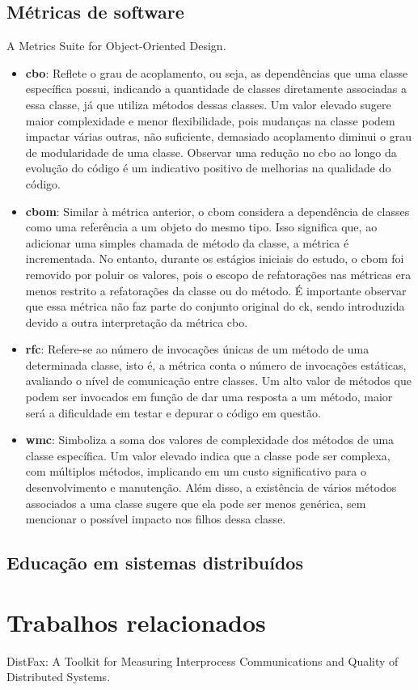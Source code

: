 \subsection{Métricas de software}
A Metrics Suite for Object-Oriented Design.
\cite{MetricsSuite}

\begin{itemize}
    \item \textbf{\gls{cbo}}: Reflete o grau de acoplamento, ou seja, as dependências que uma classe específica possui, indicando a quantidade de classes diretamente associadas a essa classe, já que utiliza métodos dessas classes. Um valor elevado sugere maior complexidade e menor flexibilidade, pois mudanças na classe podem impactar várias outras, não suficiente, demasiado acoplamento diminui o grau de modularidade de uma classe. Observar uma redução no \gls{cbo} ao longo da evolução do código é um indicativo positivo de melhorias na qualidade do código.
    \item \textbf{\gls{cbom}}: Similar à métrica anterior, o \gls{cbom} considera a dependência de classes como uma referência a um objeto do mesmo tipo. Isso significa que, ao adicionar uma simples chamada de método da classe, a métrica é incrementada. No entanto, durante os estágios iniciais do estudo, o \gls{cbom} foi removido por poluir os valores, pois o escopo de refatorações nas métricas era menos restrito a refatorações da classe ou do método. É importante observar que essa métrica não faz parte do conjunto original do \gls{ck}, sendo introduzida devido a outra interpretação da métrica \gls{cbo}.
    \item \textbf{\gls{rfc}}: Refere-se ao número de invocações únicas de um método de uma determinada classe, isto é, a métrica conta o número de invocações estáticas, avaliando o nível de comunicação entre classes. Um alto valor de métodos que podem ser invocados em função de dar uma resposta a um método, maior será a dificuldade em testar e depurar o código em questão.
    \item \textbf{\gls{wmc}}: Simboliza a soma dos valores de complexidade dos métodos de uma classe específica. Um valor elevado indica que a classe pode ser complexa, com múltiplos métodos, implicando em um custo significativo para o desenvolvimento e manutenção. Além disso, a existência de vários métodos associados a uma classe sugere que ela pode ser menos genérica, sem mencionar o possível impacto nos filhos dessa classe.
\end{itemize}
\subsection{Educação em sistemas distribuídos}


\section{Trabalhos relacionados}
\label{section:related-work}

DistFax: A Toolkit for Measuring Interprocess Communications and Quality of Distributed Systems.
\cite{DistFax}
